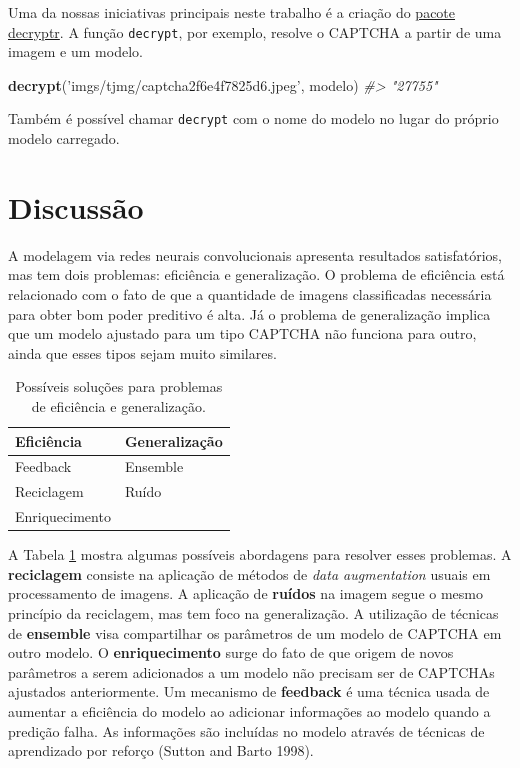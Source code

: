 \documentclass[]{elsarticle} %
\newenvironment{Shaded}{}{}
\newcommand{\CommentTok}[1]{\textit{#1}}
\newcommand{\KeywordTok}[1]{\textbf{#1}}
\newcommand{\NormalTok}[1]{#1}
\newcommand{\StringTok}[1]{#1}
\begin{document}
Uma da nossas iniciativas principais neste trabalho é a criação do \href{https://github.com/decryptr/decryptr}{pacote decryptr}. A função \texttt{decrypt}, por exemplo, resolve o CAPTCHA a partir de uma imagem e um modelo.

\begin{Shaded}
\begin{Highlighting}[]
\KeywordTok{decrypt}\NormalTok{(}\StringTok{'imgs/tjmg/captcha2f6e4f7825d6.jpeg'}\NormalTok{, modelo)}
\CommentTok{#> "27755"}
\end{Highlighting}
\end{Shaded}

Também é possível chamar \texttt{decrypt} com o nome do modelo no lugar do próprio modelo carregado.

\hypertarget{discussao}{%
\section{Discussão}\label{discussao}}

A modelagem via redes neurais convolucionais apresenta resultados satisfatórios, mas tem dois problemas: eficiência e generalização. O problema de eficiência está relacionado com o fato de que a quantidade de imagens classificadas necessária para obter bom poder preditivo é alta. Já o problema de generalização implica que um modelo ajustado para um tipo CAPTCHA não funciona para outro, ainda que esses tipos sejam muito similares.

\begin{table}

\caption{\label{tab:solucoes}Possíveis soluções para problemas de eficiência e generalização.}
\centering
\begin{tabular}[t]{l|l}
\hline
Eficiência & Generalização\\
\hline
Feedback & Ensemble\\
\hline
Reciclagem & Ruído\\
\hline
Enriquecimento & \\
\hline
\end{tabular}
\end{table}

A Tabela \ref{tab:solucoes} mostra algumas possíveis abordagens para resolver esses problemas. A \textbf{reciclagem} consiste na aplicação de métodos de \emph{data augmentation} usuais em processamento de imagens. A aplicação de \textbf{ruídos} na imagem segue o mesmo princípio da reciclagem, mas tem foco na generalização. A utilização de técnicas de \textbf{ensemble} visa compartilhar os parâmetros de um modelo de CAPTCHA em outro modelo. O \textbf{enriquecimento} surge do fato de que origem de novos parâmetros a serem adicionados a um modelo não precisam ser de CAPTCHAs ajustados anteriormente. Um mecanismo de \textbf{feedback} é uma técnica usada de aumentar a eficiência do modelo ao adicionar informações ao modelo quando a predição falha. As informações são incluídas no modelo através de técnicas de aprendizado por reforço (Sutton and Barto 1998).
\end{document}
